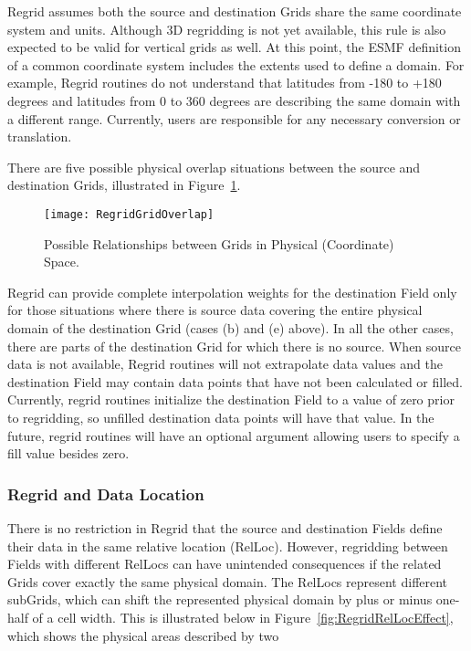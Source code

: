 Regrid assumes both the source and destination Grids share the same coordinate
system and units.  Although 3D regridding is not yet available, this rule is
also expected to be valid for vertical grids as well.  At this point, the ESMF
definition of a common coordinate system includes the extents used to define
a domain.  For example, Regrid routines do not understand that latitudes from
-180 to +180 degrees and latitudes from 0 to 360 degrees are describing the
same domain with a different range.  Currently, users are responsible for any
necessary conversion or translation.  

There are five possible physical overlap situations between the source and
destination Grids, illustrated in Figure~\ref{fig:RegridGridOverlap}.

\begin{center}
\begin{figure}
\caption{Possible Relationships between Grids in Physical (Coordinate) Space. }
\label{fig:RegridGridOverlap}
\resizebox{\textwidth}{!}
  {\texttt{[image: RegridGridOverlap]}}
\end{figure}
\end{center}

Regrid can provide complete interpolation weights for the destination Field
only for those situations where there is source data covering the entire physical
domain of the destination Grid (cases (b) and (e) above).  In all the other
cases, there are parts of the destination Grid for which there is no source. 
When source data is not available, Regrid routines will not extrapolate data
values and the destination Field may contain data points that have not been
calculated or filled.  Currently, regrid routines initialize the destination
Field to a value of zero prior to regridding, so unfilled destination data points
will have that value.  In the future, regrid routines will have an optional
argument allowing users to specify a fill value besides zero.  


\subsubsection{Regrid and Data Location}

There is no restriction in Regrid that the source and destination Fields
define their data in the same relative location (RelLoc).  However, regridding
between Fields with different RelLocs can have unintended consequences if the
related Grids cover exactly the same physical domain.  The RelLocs represent
different subGrids, which can shift the represented physical domain by plus or
minus one-half of a cell width.  This is illustrated below in
Figure~\ref{fig:RegridRelLocEffect}, which shows the physical areas described by
two

